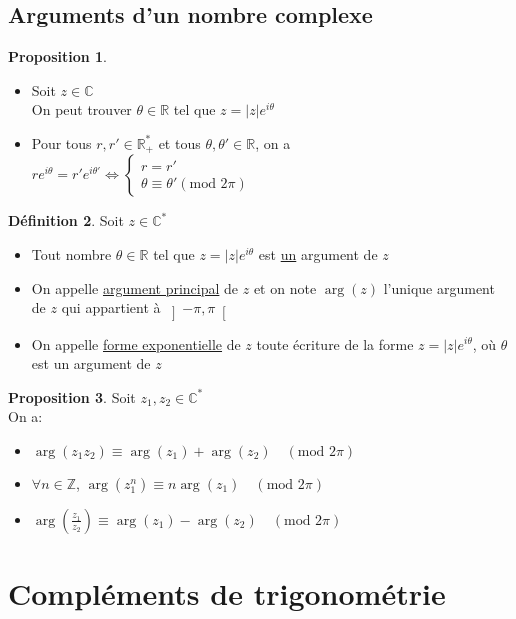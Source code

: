 \documentclass[10pt,a4paper]{article}
\theoremstyle{definition}
\newtheorem{proposition}{Proposition}[section]
\newtheorem{definition}[proposition]{Définition}
\begin{document}
\subsection{Arguments d'un nombre complexe}
\begin{proposition}
\hfill 
\begin{itemize}
\item Soit $z \in \mathbb{C}$ \\
On peut trouver $\theta \in \mathbb{R}$ tel que $z = |z|e^{i\theta}$
\item Pour tous $r, r' \in \mathbb{R}_+^*$ et tous $\theta, \theta' \in \mathbb{R}$, on a $re^{i\theta} = r'e^{i\theta'} \iff \begin{cases}
r = r' \\
\theta \equiv \theta' (\text{mod }2\pi)
\end{cases}$
\end{itemize}
\end{proposition}
\begin{definition}
Soit $z \in \mathbb{C}^*$
\begin{itemize}
\item Tout nombre $\theta \in \mathbb{R}$ tel que $z = |z|e^{i\theta}$ est \uline{un} argument de $z$
\item On appelle \uline{argument principal} de $z$ et on note $\arg(z)$ l'unique argument de $z$ qui appartient à $\left] -\pi, \pi \right[$
\item On appelle \uline{forme exponentielle} de $z$ toute écriture de la forme $z = |z|e^{i\theta}$, où $\theta$ est un argument de $z$
\end{itemize}
\end{definition}
\begin{proposition}
Soit $z_1, z_2 \in \mathbb{C}^*$ \\
On a:
\begin{itemize}
\item $\arg(z_1 z_2) \equiv \arg(z_1) + \arg(z_2) \quad (\text{mod }2\pi)$
\item $\forall n \in \mathbb{Z}$, $\arg(z_1^n) \equiv n \arg(z_1) \quad (\text{mod }2\pi)$
\item $\arg\left(\frac{z_1}{z_2}\right) \equiv \arg(z_1) - \arg(z_2) \quad (\text{mod }2\pi)$
\end{itemize}
\end{proposition}

\section{Compléments de trigonométrie}
\end{document}
